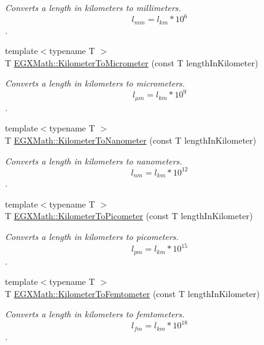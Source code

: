 \begin{DoxyCompactItemize}
\begin{DoxyCompactList}\small\item\em Converts a length in kilometers to millimeters. \[ l_{mm}=l_{km} * 10^{6} \]. \end{DoxyCompactList}\item 
{\footnotesize template$<$typename T $>$ }\\T \mbox{\hyperlink{group___e_g_x_math-_conversions-_length_conversions-_kilometer-_s_i_ga345d16c72fcb96ff1dc3b7f290b94c94}{E\+G\+X\+Math\+::\+Kilometer\+To\+Micrometer}} (const T length\+In\+Kilometer)
\begin{DoxyCompactList}\small\item\em Converts a length in kilometers to micrometers. \[ l_{\mu m}=l_{km} * 10^{9} \]. \end{DoxyCompactList}\item 
{\footnotesize template$<$typename T $>$ }\\T \mbox{\hyperlink{group___e_g_x_math-_conversions-_length_conversions-_kilometer-_s_i_gaa2272319841906222fd95dc1c3e90549}{E\+G\+X\+Math\+::\+Kilometer\+To\+Nanometer}} (const T length\+In\+Kilometer)
\begin{DoxyCompactList}\small\item\em Converts a length in kilometers to nanometers. \[ l_{nm}=l_{km} * 10^{12} \]. \end{DoxyCompactList}\item 
{\footnotesize template$<$typename T $>$ }\\T \mbox{\hyperlink{group___e_g_x_math-_conversions-_length_conversions-_kilometer-_s_i_ga73f6e033de3c41892f06cde1862f68d6}{E\+G\+X\+Math\+::\+Kilometer\+To\+Picometer}} (const T length\+In\+Kilometer)
\begin{DoxyCompactList}\small\item\em Converts a length in kilometers to picometers. \[ l_{pm}=l_{km} * 10^{15} \]. \end{DoxyCompactList}\item 
{\footnotesize template$<$typename T $>$ }\\T \mbox{\hyperlink{group___e_g_x_math-_conversions-_length_conversions-_kilometer-_s_i_ga74e9c4726fddf2091c1d687e7c5f4b37}{E\+G\+X\+Math\+::\+Kilometer\+To\+Femtometer}} (const T length\+In\+Kilometer)
\begin{DoxyCompactList}\small\item\em Converts a length in kilometers to femtometers. \[ l_{fm}=l_{km} * 10^{18} \]. \end{DoxyCompactList}\item 

\end{DoxyCompactItemize}

